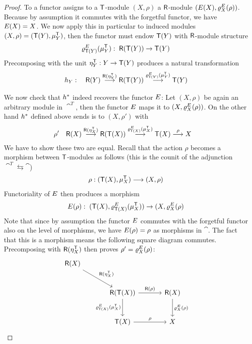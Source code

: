 \documentclass[a4paper, reqno]{amsart}
\theoremstyle{introTheorems}
\renewcommand{\1}{\mathbbold{1}}
\begin{document}
\begin{proof}
To a functor assigns to a ${\mathsf{T}}$-module $(X,\rho)$ a ${\mathsf{R}}$-module $(E(X),\varrho^E_X(\rho))$. Because by assumption it commutes with the forgetful functor, we have $E(X)=X$. We now apply this in particular to induced modules $(X,\rho)=({\mathsf{T}}(Y),\mu^{\mathsf{T}}_Y)$, then the functor must endow ${\mathsf{T}}(Y)$ with ${\mathsf{R}}$-module structure 
$$\varrho^E_{{\mathsf{T}}(Y)}(\mu^{\mathsf{T}}_Y):\; {\mathsf{R}}({\mathsf{T}}(Y))\to {\mathsf{T}}(Y)$$
Precomposing with the unit $\eta^{\mathsf{T}}_Y:Y\to {\mathsf{T}}(Y)$ produces a natural transformation
$$h_Y:\quad
{\mathsf{R}}(Y)
\stackrel{{\mathsf{R}}(\eta^{\mathsf{T}}_Y)}{\longrightarrow}
{\mathsf{R}}({\mathsf{T}}(Y))
\stackrel{\varrho^E_{{\mathsf{T}}(Y)}(\mu^{\mathsf{T}}_Y)}{\longrightarrow}
{\mathsf{T}}(Y)$$

\bigskip

We now check that $h^*$ indeed recovers the functor $E$: Let $(X,\rho)$ be again an arbitrary module in $\cat^T$, then the functor $E$ maps it to $(X,\varrho_X^E(\rho))$.
On the other hand 
$h^*$ defined above sends is to $(X,\rho')$ with 
\begin{align*}
\rho'\quad
&{\mathsf{R}}(X)
\stackrel{{\mathsf{R}}(\eta_X^{\mathsf{T}})}{\longrightarrow}
{\mathsf{R}}({\mathsf{T}}(X))
\stackrel{\varrho^E_{{\mathsf{T}}(X)}(\mu_X^{\mathsf{T}})}{\longrightarrow}
{\mathsf{T}}(X)
\stackrel{\rho}{\longrightarrow} 
X
\end{align*}
We have to show these two are equal. Recall that the action $\rho$ becomes a morphism between ${\mathsf{T}}$-modules as follows (this is the counit of the adjunction $\cat^T\leftrightarrows \cat$)
$$\rho:({\mathsf{T}}(X),\mu_X^{\mathsf{T}})\longrightarrow (X,\rho)$$
Functoriality of $E$ then produces a morphism 
$$E(\rho):\;
({\mathsf{T}}(X),\varrho_{{\mathsf{T}}(X)}^E(\mu_X^{\mathsf{T}}))
\to 
(X,\varrho_{X}^E(\rho)
$$
Note that since by assumption the functor $E$ commutes with the forgetful functor also on the level of morphisms, we have $E(\rho)=\rho$ as morphisms in $\cat$. The fact that this is a morphism means the following square diagram commutes. Precomposing with ${\mathsf{R}}(\eta_X^{\mathsf{T}})$ then proves $\rho'=\varrho_{X}^E(\rho)$:
\[\begin{tikzcd}[row sep=6ex, column sep=8ex]
\monR(X)
\arrow[rd, "\monR(\eta_X^\monT)"]
\\
&
\monR(\monT(X))
\arrow[r, "\monR(\rho)"]
\arrow[d, swap,"\varrho_{\monT(X)}^\funE(\mu_X^\monT)"]
&
\monR(X)
\arrow[d, "\varrho_{X}^\funE(\rho)"]
\\
&
\monT(X)
\arrow[r, "\rho"]
&
X
\end{tikzcd}\]
\end{proof}
\end{document}
